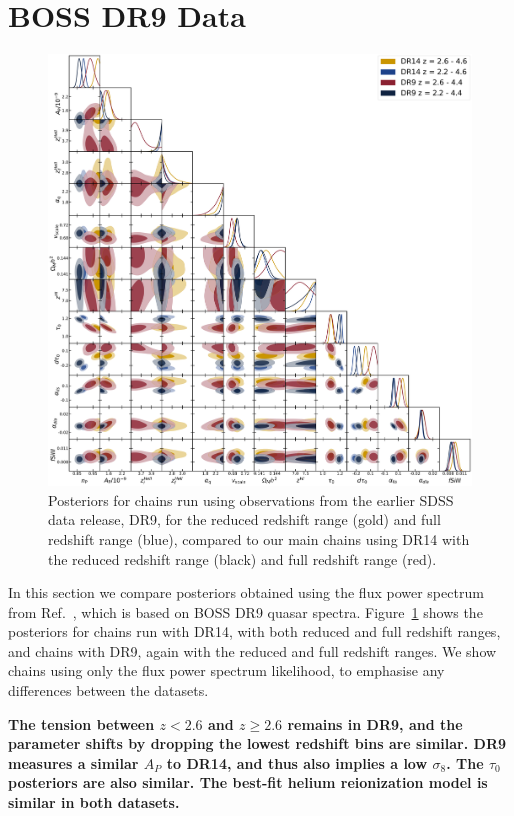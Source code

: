 \section{BOSS DR9 Data}\label{sec:dr9_results}
\begin{figure}
    \centering
    \includegraphics[width=\textwidth]{figures/dr9_allp_corner.pdf}
    \caption{\label{fig:dr9_corner}
    Posteriors for chains run using observations from the earlier SDSS data release, DR9, for the reduced redshift range (gold) and full redshift range (blue), compared to our main chains using DR14 with the reduced redshift range (black) and full redshift range (red).
    }
\end{figure}

In this section we compare posteriors obtained using the flux power spectrum from Ref.~\cite{2013A&A...559A..85P}, which is based on BOSS DR9 quasar spectra.
Figure~\ref{fig:dr9_corner} shows the posteriors for chains run with DR14, with both reduced and full redshift ranges, and chains with DR9, again with the reduced and full redshift ranges. We show chains using only the flux power spectrum likelihood, to emphasise any differences between the datasets.

\textbf{The tension between $z <2.6$ and $z \geq 2.6$ remains in DR9, and the parameter shifts by dropping the lowest redshift bins are similar. DR9 measures a similar $A_P$ to DR14, and thus also implies a low $\sigma_8$.
The $\tau_0$ posteriors are also similar. The best-fit helium reionization model is similar in both datasets.}

